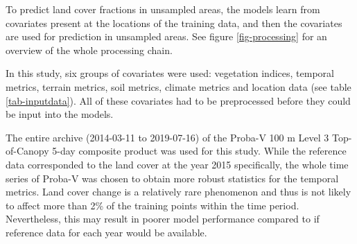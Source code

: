 \documentclass[review,authoryear,3p]{elsarticle}
\begin{document}
To predict land cover fractions in unsampled areas, the models learn from covariates present at the locations of the training data, and then the covariates are used for prediction in unsampled areas.
See figure \ref{fig-processing} for an overview of the whole processing chain.

In this study, six groups of covariates were used: vegetation indices, temporal metrics, terrain metrics, soil metrics, climate metrics and location data (see table \ref{tab-inputdata}).
All of these covariates had to be preprocessed before they could be input into the models.


\label{sec-temporal-filter}

The entire archive (2014-03-11 to 2019-07-16) of the Proba-V 100 m Level 3 Top-of-Canopy 5-day composite product \citep{probavguide2} was used for this study.
While the reference data corresponded to the land cover at the year 2015 specifically, the whole time series of Proba-V was chosen to obtain more robust statistics for the temporal metrics.
Land cover change is a relatively rare phenomenon and thus is not likely to affect more than 2\% of the training points within the time period.
Nevertheless, this may result in poorer model performance compared to if reference data for each year would be available.
\end{document}

